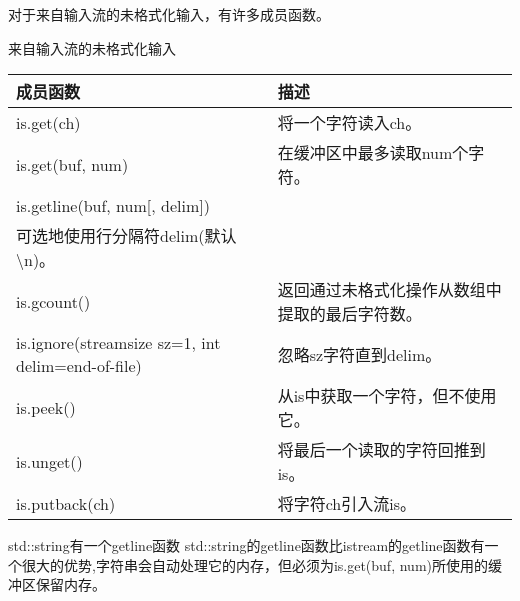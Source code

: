 
对于来自输入流的未格式化输入，有许多成员函数。

\begin{center}
来自输入流的未格式化输入
\end{center}

\begin{longtable}[c]{|l|l|}
\hline
\textbf{成员函数}                          & \textbf{描述}                                                                 \\ \hline
\endfirsthead
%
\endhead
%
is.get(ch)                                        & 将一个字符读入ch。                                                         \\ \hline
is.get(buf, num)                                  & 在缓冲区中最多读取num个字符。                                    \\ \hline
is.getline(buf, num{[}, delim{]}) &
\begin{tabular}[c]{@{}l@{}}在缓冲区中最多读取num个字符。\\ 可选地使用行分隔符delim(默认\textbackslash{}n)。\end{tabular} \\ \hline
is.gcount()                                       & 返回通过未格式化操作从数组中提取的最后字符数。 \\ \hline
is.ignore(streamsize sz=1, int delim=end-of-file) & 忽略sz字符直到delim。                                                   \\ \hline
is.peek()                                         & 从is中获取一个字符，但不使用它。                                     \\ \hline
is.unget()                                        & 将最后一个读取的字符回推到is。                                           \\ \hline
is.putback(ch)                                    & 将字符ch引入流is。                                          \\ \hline
\end{longtable}

\begin{myTip}{std::string有一个getline函数}
std::string的getline函数比istream的getline函数有一个很大的优势,字符串会自动处理它的内存，但必须为is.get(buf, num)所使用的缓冲区保留内存。
\end{myTip}

